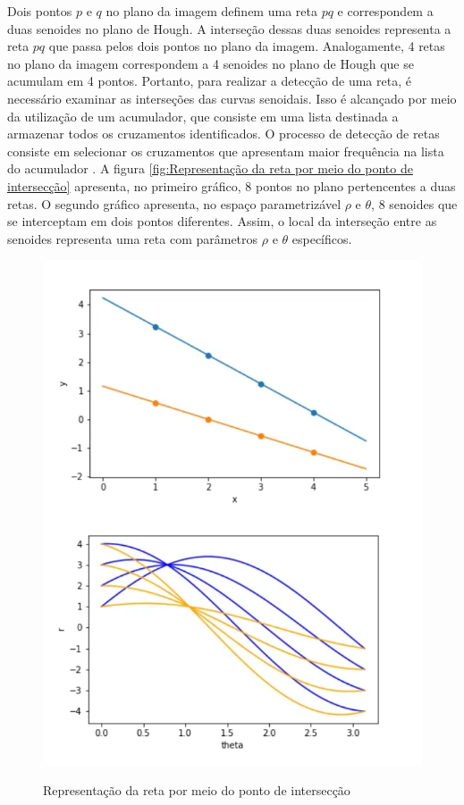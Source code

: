 Dois pontos $p$ e $q$ no plano da imagem definem uma reta $pq$ e correspondem a duas senoides no plano de Hough. A interseção dessas duas senoides representa a reta $pq$ que passa pelos dois pontos no plano da imagem. Analogamente, 4 retas no plano da imagem correspondem a 4 senoides no plano de Hough que se acumulam em 4 pontos. Portanto, para realizar a detecção de uma reta, é necessário examinar as interseções das curvas senoidais. Isso é alcançado por meio da utilização de um acumulador, que consiste em uma lista destinada a armazenar todos os cruzamentos identificados. O processo de detecção de retas consiste em selecionar os cruzamentos que apresentam maior frequência na lista do acumulador \cite{transformadaHough2}. A figura \ref{fig:Representação da reta por meio do ponto de intersecção} apresenta, no primeiro gráfico, 8 pontos no plano pertencentes a duas retas. O segundo gráfico apresenta, no espaço parametrizável $\rho$ e $\theta$, 8 senoides que se interceptam em dois pontos diferentes. Assim, o local da interseção entre as senoides representa uma reta com parâmetros $\rho$ e $\theta$ específicos.


\begin{figure}[!htb]
	\centering
    \caption{Representação da reta por meio do ponto de intersecção}
	\includegraphics[scale=0.5]{figuras/math/senoidesIterseccao.png}
	\label{fig:Representacao da reta por meio do ponto de interseccao}
\end{figure}




